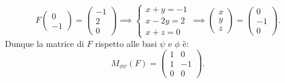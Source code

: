\documentclass{article}
\theoremstyle{plain}
\theoremstyle{definition}
\theoremstyle{remark}
\begin{document}
\[F\begin{pmatrix}0\\-1\end{pmatrix}=\begin{pmatrix}-1\\2\\0\end{pmatrix}\implies
\begin{cases}
    x+y=-1\\
    x-2y=2\\
    x+z=0
\end{cases}\implies \begin{pmatrix}x\\y\\z\end{pmatrix} = \begin{pmatrix}0\\-1\\0\end{pmatrix}
.\]
Dunque la matrice di $F$ rispetto alle basi $\psi$ e $\phi$ è: 
\[
M_{\phi\psi}(F)=\begin{pmatrix}
    1 & 0\\
    1 & -1\\
    0 & 0   
\end{pmatrix}.
\]


\vspace{10pt}
\end{document}
